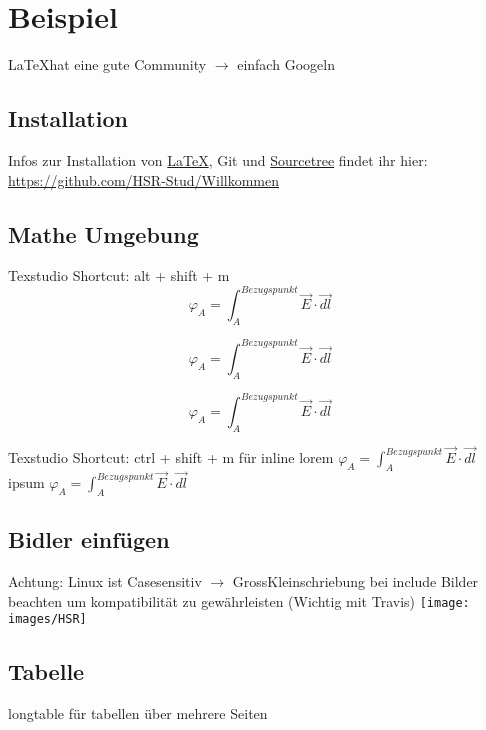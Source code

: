\section*{Beispiel}
\LaTeX  hat eine gute Community $\rightarrow$ einfach Googeln

\subsection{Installation}
Infos zur Installation von \href{https://github.com/HSR-Stud/Willkommen/blob/master/installation.md#latex}{\LaTeX}, Git und \href{https://github.com/HSR-Stud/Willkommen/blob/master/installation.md#sourcetree}{Sourcetree} findet ihr hier: \url{https://github.com/HSR-Stud/Willkommen}

\subsection{Mathe Umgebung}
Texstudio Shortcut: alt + shift + m
\[ \varphi_A = \int_{A}^{Bezugspunkt}\vec{E}\cdot\vec{dl} \]

\begin{equation*}
\varphi_A = \int_{A}^{Bezugspunkt}\vec{E}\cdot\vec{dl}
\end{equation*}


\begin{equation}
    \varphi_A = \int_{A}^{Bezugspunkt}\vec{E}\cdot\vec{dl}
\end{equation}

Texstudio Shortcut: ctrl + shift + m für inline \newline
lorem $ \varphi_A = \int_{A}^{Bezugspunkt}\vec{E}\cdot\vec{dl}$ ipsum $ \varphi_A = \int_{A}^{Bezugspunkt}\vec{E}\cdot\vec{dl}$

\subsection{Bidler einfügen}
Achtung: Linux ist Casesensitiv $\rightarrow$ GrossKleinschriebung bei include Bilder beachten um kompatibilität zu gewährleisten (Wichtig mit Travis)\newline
\texttt{[image: images/HSR]}

\subsection{Tabelle}

    
longtable für tabellen über mehrere Seiten

